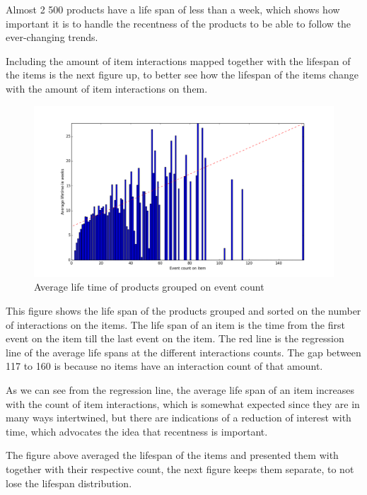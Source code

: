Almost 2 500 products have a life span of less than a week, which shows how
important it is to handle the recentness of the products to be able to follow
the ever-changing trends.

Including the amount of item interactions mapped together with the lifespan of
the items is the next figure up, to better see how the lifespan of the items
change with the amount of item interactions on them.

\begin{figure}[H]
  \centering
  \includegraphics[width=5in]{image/avglifetimeoncount.png}
  \caption{Average life time of products grouped on event count}
  \label{figure:averageLifetimBasedoncount}
\end{figure}

This figure shows the life span of the products grouped and sorted on the
number of interactions on the items.  The life span of an item is the time from
the first event on the item till the last event on the item.  The red line is
the regression line of the average life spans at the different interactions
counts.  The gap between 117 to 160 is because no items have an interaction
count of that amount.

As we can see from the regression line, the average life span of an item
increases with the count of item interactions, which is somewhat expected since
they are in many ways intertwined, but there are indications of a reduction of
interest with time, which advocates the idea that recentness is important.

The figure above averaged the lifespan of the items and presented them with
together with their respective count, the next figure keeps them separate, to
not lose the lifespan distribution.

